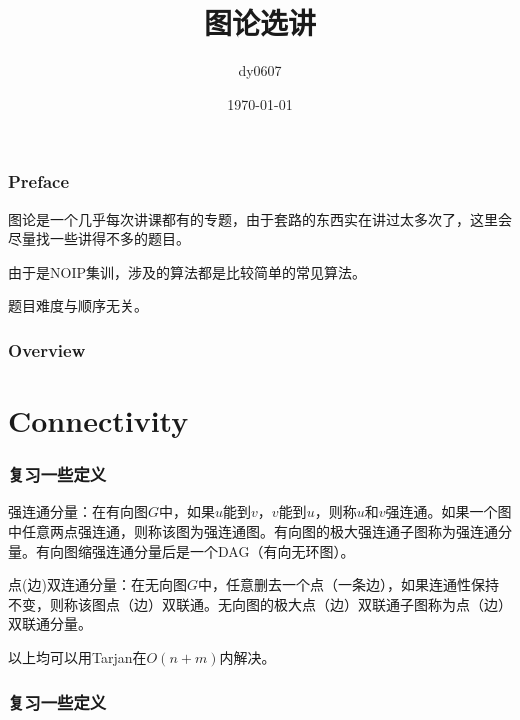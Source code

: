 \documentclass[10pt]{beamer}
\begin{document}
\begin{CJK}{UTF8}{gkai}
\begin{spacing}{1.1}

\title[图论选讲]{图论选讲} %

\author{dy0607} %
\date{\today} %

\begin{frame}
\titlepage %
\end{frame}

\begin{frame}
\frametitle{Preface} 

	图论是一个几乎每次讲课都有的专题，由于套路的东西实在讲过太多次了，这里会尽量找一些讲得不多的题目。 \pause

	由于是NOIP集训，涉及的算法都是比较简单的常见算法。\pause

	题目难度与顺序无关。

\end{frame}

\begin{frame}
\frametitle{Overview}
\tableofcontents[hideallsubsections]
\end{frame}

\section{Connectivity}

\begin{frame}
\frametitle{复习一些定义}

	强连通分量：在有向图$G$中，如果$u$能到$v$，$v$能到$u$，则称$u$和$v$强连通。如果一个图中任意两点强连通，则称该图为强连通图。有向图的极大强连通子图称为强连通分量。有向图缩强连通分量后是一个DAG（有向无环图）。\pause

	点(边)双连通分量：在无向图$G$中，任意删去一个点（一条边），如果连通性保持不变，则称该图点（边）双联通。无向图的极大点（边）双联通子图称为点（边）双联通分量。

	以上均可以用Tarjan在$O(n + m)$内解决。

\end{frame}

\begin{frame}
\frametitle{复习一些定义}


\end{frame}
\end{spacing}
\end{CJK}
\end{document}
